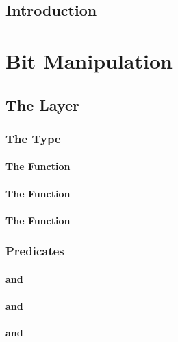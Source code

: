 \documentclass[paper=a4,12pt,DIV16,BCOR8mm,twoside]{scrreprt}
\begin{document}

%
%
%

\tableofcontents

\chapter{Introduction}

\part{Bit Manipulation}

\chapter{The  Layer}

\section{The Type }
\subsection{The Function }
\subsection{The Function }
\subsection{The Function }

\section{Predicates}
\subsection{ and }
\subsection{ and }
\subsection{ and }
\end{document}
